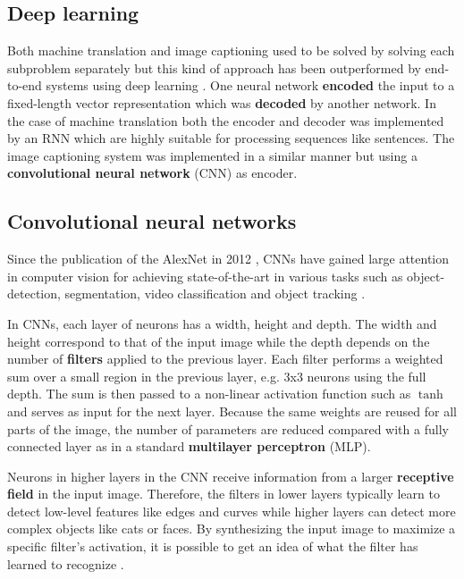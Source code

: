 
\subsection{Deep learning}

Both machine translation and image captioning used to be solved by solving each subproblem separately but this kind of approach has been outperformed by end-to-end systems using deep learning \cite{ShowAndTell}. One neural network \textbf{encoded} the input to a fixed-length vector representation which was \textbf{decoded} by another network. In the case of machine translation both the encoder and decoder was implemented by an RNN which are highly suitable for processing sequences like sentences. The image captioning system was implemented in a similar manner but using a \textbf{convolutional neural network} (CNN) as encoder.

\subsection{Convolutional neural networks}

Since the publication of the AlexNet in 2012 \cite{AlexNet}, CNNs have gained large attention in computer vision for achieving state-of-the-art in various tasks such as object-detection, segmentation, video classification and object tracking \cite{InceptionV3}.


In CNNs, each layer of neurons has a width, height and depth. The width and height correspond to that of the input image while the depth depends on the number of \textbf{filters} applied to the previous layer.
Each filter performs a weighted sum over a small region in the previous layer, e.g. 3x3 neurons using the full depth. The sum is then passed to a non-linear activation function such as $\tanh$ and serves as input for the next layer.
Because the same weights are reused for all parts of the image, the number of parameters are reduced compared with a fully connected layer as in a standard \textbf{multilayer perceptron} (MLP).

Neurons in higher layers in the CNN receive information from a larger \textbf{receptive field} in the input image. Therefore, the filters in lower layers typically learn to detect low-level features like edges and curves while higher layers can detect more complex objects like cats or faces.
By synthesizing the input image to maximize a specific filter's activation, it is possible to get an idea of what the filter has learned to recognize \cite{VisualizeCnn}.

